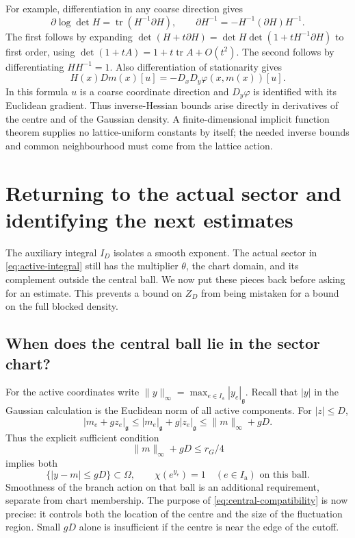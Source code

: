 \documentclass[11pt,reqno]{amsart}
\numberwithin{equation}{section}
\theoremstyle{definition}
\theoremstyle{remark}
\newcommand{\g}{\mathfrak g}
\newcommand{\Ia}{I_{\mathrm a}}
\DeclareMathOperator{\tr}{tr}
\begin{document}
For example, differentiation in any coarse direction gives
\begin{equation}
 \partial\log\det H
        =\tr(H^{-1}\partial H),\qquad
 \partial H^{-1}
        =-H^{-1}(\partial H)H^{-1}.
 \label{eq:matrix-derivatives}
\end{equation}
The first follows by expanding
\(\det(H+t\partial H)
 =\det H\det(1+tH^{-1}\partial H)\)
to first order, using \(\det(1+tA)=1+t\tr A+O(t^2)\).
The second follows by differentiating
\(HH^{-1}=1\).
Also differentiation of stationarity gives
\begin{equation}
        H(x)Dm(x)[u]
                  =-D_xD_y\varphi(x,m(x))[u].
 \label{eq:stationary-derivative}
\end{equation}
In this formula \(u\) is a coarse coordinate direction and
\(D_y\varphi\) is identified with its Euclidean gradient.
Thus inverse-Hessian bounds arise directly in derivatives of
the centre and of the Gaussian density. A finite-dimensional
implicit function theorem supplies no lattice-uniform constants
by itself; the needed inverse bounds and common neighbourhood must
come from the lattice action.

\section{Returning to the actual sector and identifying the next estimates}
\label{sec:next}

The auxiliary integral \(I_D\) isolates a smooth exponent. The
actual sector in \eqref{eq:active-integral} still has the multiplier
\(\theta\), the chart domain, and its complement outside the
central ball. We now put these pieces back before asking for an
estimate. This prevents a bound on \(Z_D\) from being mistaken
for a bound on the full blocked density.

\subsection{When does the central ball lie in the sector chart?}

For the active coordinates write
\(\|y\|_\infty=\max_{e\in\Ia}|y_e|_{\g}\).
Recall that \(|y|\) in the Gaussian calculation is the Euclidean
norm of all active components. For \(|z|\le D\),
\[
       |m_e+gz_e|_{\g}
          \le|m_e|_{\g}+g|z_e|_{\g}
          \le\|m\|_\infty+gD.
\]
Thus the explicit sufficient condition
\begin{equation}
                     \|m\|_\infty+gD\le r_G/4
 \label{eq:central-compatibility}
\end{equation}
implies both
\begin{equation}
 \{|y-m|\le gD\}\subset\Omega,
 \qquad \chi(e^{y_e})=1\quad(e\in\Ia)
                         \text{ on this ball}.
 \label{eq:compatible-ball}
\end{equation}
Smoothness of the branch action on that ball is an additional
requirement, separate from chart membership. The purpose of
\eqref{eq:central-compatibility} is now precise: it controls both
the location of the centre and the size of the fluctuation region.
Small \(gD\) alone is insufficient if the centre is near the edge
of the cutoff.
\end{document}
